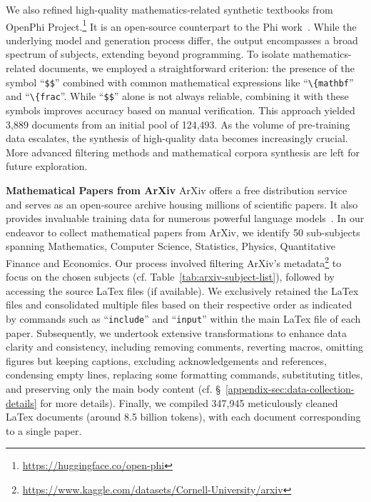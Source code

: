We also refined high-quality mathematics-related synthetic textbooks from OpenPhi Project.\footnote{\url{https://huggingface.co/open-phi}} It is an open-source counterpart to the Phi work~\citep{DBLP:journals/corr/abs-2306-11644-textbooks-are-all-you-need}. While the underlying model and generation process differ, the output encompasses a broad spectrum of subjects, extending beyond programming. To isolate mathematics-related documents, we employed a straightforward criterion: the presence of the symbol ``\texttt{\$\$}'' combined with common mathematical expressions like ``\verb|\|\texttt{\{mathbf}'' and  ``\verb|\|\texttt{\{frac}''.  While ``\texttt{\$\$}'' alone is not always reliable, combining it with these symbols improves accuracy based on manual verification. This approach yielded 3,889 documents from an initial pool of 124,493. As the volume of pre-training data escalates, the synthesis of high-quality data becomes increasingly crucial. More advanced filtering methods and mathematical corpora synthesis are left for future exploration.

\noindent\textbf{Mathematical Papers from ArXiv} \quad ArXiv offers a free distribution service and serves as an open-source archive housing  millions of scientific papers. It also provides  invaluable training data for numerous powerful language models~. In our endeavor to collect mathematical papers from ArXiv, we identify 50 sub-subjects spanning Mathematics, Computer Science, Statistics, Physics, Quantitative Finance and Economics. Our process involved filtering ArXiv's metadata\footnote{\url{https://www.kaggle.com/datasets/Cornell-University/arxiv}} to focus on the chosen subjects (cf. Table~\ref{tab:arxiv-subject-list}), followed by accessing the source LaTex files (if available). We exclusively retained the LaTex files and consolidated multiple files based on their respective order as indicated by commands such as ``\texttt{include}'' and ``\texttt{input}'' within the main LaTex file of each paper. Subsequently, we undertook extensive transformations to enhance data clarity and consistency, including removing comments, reverting macros, omitting figures but keeping captions, excluding acknowledgements and references, condensing empty lines, replacing some formatting commands, substituting titles, and preserving only the main body content (cf. \S~\ref{appendix-sec:data-collection-details} for more details). Finally, we compiled 347,945 meticulously cleaned LaTex documents (around 8.5 billion tokens), with each document corresponding to a single paper. 

